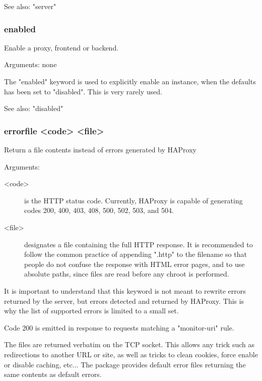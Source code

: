   See also: "server"

\subsubsection[enabled]{enabled}
  Enable a proxy, frontend or backend.
  
  
  Arguments: none

  The "enabled" keyword is used to explicitly enable an instance, when the
  defaults has been set to "disabled". This is very rarely used.

  See also: "disabled"

\subsubsection[errorfile]{errorfile <code> <file>}
  Return a file contents instead of errors generated by HAProxy
  

  Arguments:
  \begin{description}
  \item[<code>]    is the HTTP status code. Currently, HAProxy is capable of
              generating codes 200, 400, 403, 408, 500, 502, 503, and 504.

   \item[<file>]    designates a file containing the full HTTP response. It is
              recommended to follow the common practice of appending ".http" to
              the filename so that people do not confuse the response with HTML
              error pages, and to use absolute paths, since files are read
              before any chroot is performed.
  \end{description}

  It is important to understand that this keyword is not meant to rewrite
  errors returned by the server, but errors detected and returned by HAProxy.
  This is why the list of supported errors is limited to a small set.

  Code 200 is emitted in response to requests matching a "monitor-uri" rule.

  The files are returned verbatim on the TCP socket. This allows any trick such
  as redirections to another URL or site, as well as tricks to clean cookies,
  force enable or disable caching, etc... The package provides default error
  files returning the same contents as default errors.

